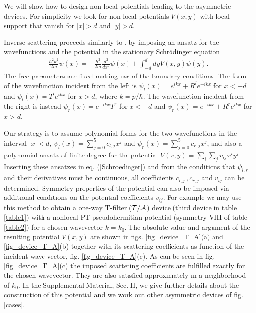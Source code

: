 We will show  how to design non-local potentials
leading to the asymmetric devices.
For simplicity we look for  non-local potentials $V(x,y)$ with local support
that vanish  for $|x| >d$ and $|y| >d$.

Inverse scattering proceeds similarly to \cite{Palao1998},
by imposing an ansatz
for the wavefunctions and the potential
in the stationary Schr\"odinger equation
%
\begin{eqnarray}
  \frac{\hbar^2k^2}{2m} \psi (x) = - \frac{\hbar^2}{2m} \frac{d^2}{dx^2} \psi (x)
  +\!\!\int_{-d}^d \!dy V(x, y) \psi(y).
  \label{Schroedinger}
\end{eqnarray}
%
The free parameters are fixed making use of the boundary conditions.
The form of the wavefunction incident from the left is
$\psi_l(x) = e^{i k x} + R^l e^{-i k x}$ for $x < -d$ and $\psi_l (x) = T^l e^{i k x}$ for $x > d$,
where  $k=p/\hbar$.
The wavefunction incident from the right is instead
$\psi_r(x) = e^{-ikx} T^r$ for $x < -d$ and $\psi_r (x) = e^{-i k x} + R^r e^{i k x}$ for $x > d$.

Our strategy is to assume  polynomial forms for the two wavefunctions in the interval $|x| < d$,
$\psi_l (x) = \sum_{j=0}^5 c_{l,j} x^j$ and $\psi_r (x) = \sum_{j=0}^5 c_{r,j} x^j$, and also a
polynomial ansatz of finite degree for the potential $V(x,y) = \sum_i \sum_j v_{ij} x^i y^j$.
Inserting these ansatzes in eq. (\ref{Schroedinger}) and from the conditions that $\psi_{l,r}$
and their derivatives must be continuous, all coefficients $c_{l,j}\,,c_{r,j}$ and $v_{ij}$ can be determined.
Symmetry properties of the potential can also be imposed via additional conditions on
the potential coefficients $v_{ij}$. For example we may use this method to obtain a one-way T-filter ($\cal{T/A}$) device (third device in table \ref{table1}) with a nonlocal PT-pseudohermitian potential (symmetry VIII of table \ref{table2}) for a chosen wavevector $k = k_0$. The absolute value and argument of the resulting potential $V(x,y)$ are shown in figs. \ref{fig_device_T_A}(a) and \ref{fig_device_T_A}(b) together with its scattering coefficients as function of the incident wave vector, fig. \ref{fig_device_T_A}(c). As can be seen in fig. \ref{fig_device_T_A}(c) the imposed scattering coefficients are fulfilled exactly for the chosen wavevector. They are also satisfied approximately in a neighborhood of $k_0$. In the  Supplemental Material, Sec. II, we give further details about the construction of this potential and we work out other asymmetric devices of fig. \ref{cases}.
%
%
%
%
%


